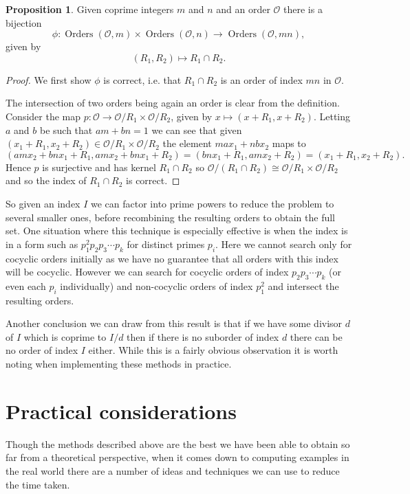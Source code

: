 \documentclass[12pt,a4paper,abstracton,bibtotoc]{scrreprt}
\theoremstyle{definition}
\newtheorem{prop}{Proposition}
\renewcommand{\O}{\mathcal{O}}
\DeclareMathOperator{\Orders}{Orders}
\begin{document}
\begin{prop}
Given coprime integers $m$ and $n$ and an order $\O$ there is a bijection
\[
\phi\colon\Orders(\O,m)\times\Orders(\O,n) \to \Orders(\O,mn),
\]
given by
\[
(R_1,R_2) \mapsto R_1 \cap R_2.
\]
\end{prop}

\begin{proof}
We first show $\phi$ is correct, i.e. that $R_1\cap R_2$ is an order of index $mn$ in $\O$.

The intersection of two orders being again an order is clear from the definition.
Consider the map $p\colon \O \to \O/R_1 \times \O/R_2$, given by $x\mapsto (x+R_1,x+R_2)$.
Letting $a$ and $b$ be such that $am + bn = 1$ we can see that given $(x_1 + R_1,x_2 + R_2)\in \O/R_1 \times \O/R_2$ the element $max_1 + nbx_2$ maps to
\[
(amx_2 + bnx_1 + R_1, amx_2 + bnx_1 + R_2) = (bnx_1 + R_1, amx_2 + R_2) = (x_1 + R_1,x_2 + R_2).
\]
Hence $p$ is surjective and has kernel $R_1 \cap R_2$ so $\O/(R_1\cap R_2) \cong \O/R_1 \times \O/R_2$ and so the index of $R_1 \cap R_2$ is correct.
\end{proof}

So given an index $I$ we can factor into prime powers to reduce the problem to several smaller ones, before recombining the resulting orders to obtain the full set.
One situation where this technique is especially effective is when the index is in a form such as $p_1^2p_2p_3\cdots p_k$ for distinct primes $p_i$.
Here we cannot search only for cocyclic orders initially as we have no guarantee that all orders with this index will be cocyclic.
However we can search for cocyclic orders of index $p_2p_3\cdots p_k$ (or even each $p_i$ individually) and non-cocyclic orders of index $p_1^2$ and intersect the resulting orders.

Another conclusion we can draw from this result is that if we have some divisor $d$ of $I$ which is coprime to $I/d$ then if there is no suborder of index $d$ there can be no order of index $I$ either.
While this is a fairly obvious observation it is worth noting when implementing these methods in practice.


\section{Practical considerations}
Though the methods described above are the best we have been able to obtain so far from a theoretical perspective, when it comes down to computing examples in the real world there are a number of ideas and techniques we can use to reduce the time taken.
\end{document}
